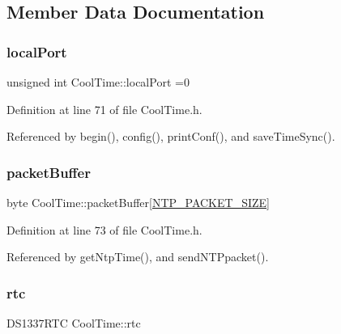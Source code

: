 \subsection{Member Data Documentation}
\mbox{\label{classCoolTime_a2f777da44d7ba678be8185299e9b49d1}} 
\subsubsection{\texorpdfstring{local\+Port}{localPort}}
{\footnotesize\ttfamily unsigned int Cool\+Time\+::local\+Port =0\hspace{0.3cm}{\ttfamily [private]}}



Definition at line 71 of file Cool\+Time.\+h.



Referenced by begin(), config(), print\+Conf(), and save\+Time\+Sync().

\mbox{\label{classCoolTime_a27e6abc82a5c2f72161956967005bec7}} 
\subsubsection{\texorpdfstring{packet\+Buffer}{packetBuffer}}
{\footnotesize\ttfamily byte Cool\+Time\+::packet\+Buffer\mbox{[}\hyperlink{CoolTime_8h_a56a6ea64006651b4f42adf713e244f06}{N\+T\+P\+\_\+\+P\+A\+C\+K\+E\+T\+\_\+\+S\+I\+ZE}\mbox{]}\hspace{0.3cm}{\ttfamily [private]}}



Definition at line 73 of file Cool\+Time.\+h.



Referenced by get\+Ntp\+Time(), and send\+N\+T\+Ppacket().

\mbox{\label{classCoolTime_abd38f2384ff90692b1568d9db869412e}} 
\subsubsection{\texorpdfstring{rtc}{rtc}}
{\footnotesize\ttfamily D\+S1337\+R\+TC Cool\+Time\+::rtc\hspace{0.3cm}{\ttfamily [private]}}




